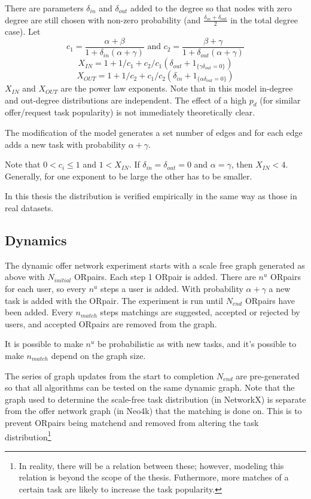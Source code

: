 \documentclass[main.tex]{subfiles}
\begin{document}
There are parameters $\delta_{in}$ and $\delta_{out}$ added to the degree so that nodes with zero degree are still chosen with non-zero probability (and $\frac{\delta_{in} + \delta_{out}}{2}$ in the total degree case). Let
$$c_1 = \frac{\alpha + \beta}{1 + \delta_{in}(\alpha + \gamma)} \mbox{ and } c_2 = \frac{\beta + \gamma}{1 + \delta_{out}(\alpha + \gamma)}$$
$$X_{IN} = 1 + 1/c_1 + c_2/c_1(\delta_{out} + 1_{\{\gamma \delta_{out}=0\}})$$
$$X_{OUT} = 1 + 1/c_2 + c_1/c_2(\delta_{in} + 1_{\{\alpha \delta_{out}=0\}})$$
$X_{IN}$ and $X_{OUT}$ are the power law exponents. Note that in this model in-degree and out-degree distributions are independent. The effect of a high $p_d$ (for similar offer/request task popularity) is not immediately theoretically clear.

The modification of the model generates a set number of edges and for each edge adds a new task with probability $\alpha + \gamma$.

Note that $ 0 < c_i \leq 1$ and $1 < X_{IN}$. If $\delta_{in} = \delta_{out} = 0$ and $\alpha = \gamma$, then $X_{IN} < 4$. Generally, for one exponent to be large the other has to be smaller.

In this thesis the distribution is verified empirically in the same way as those in real datasets.

\subsection{Dynamics}
The dynamic offer network experiment starts with a scale free graph generated as above with $N_{initial}$ ORpairs. Each step 1 ORpair is added. There are $n^u$ ORpairs for each user, so every $n^u$ steps a user is added. With probability $\alpha + \gamma$ a new task is added with the ORpair. The experiment is run until $N_{end}$ ORpairs have been added. Every $n_{match}$ steps matchings are suggested, accepted or rejected by users, and accepted ORpairs are removed from the graph.

It is possible to make $n^u$ be probabilistic as with new tasks, and it's possible to make $n_{match}$ depend on the graph size.

The series of graph updates from the start to completion $N_{end}$ are pre-generated so that all algorithms can be tested on the same dynamic graph. Note that the graph used to determine the scale-free task distribution (in NetworkX) is separate from the offer network graph (in Neo4k) that the matching is done on. This is to prevent ORpairs being matchend and removed from altering the task distribution\footnote{In reality, there will be a relation between these; however, modeling this relation is beyond the scope of the thesis. Futhermore, more matches of a certain task are likely to increase the task popularity.}
\end{document}
